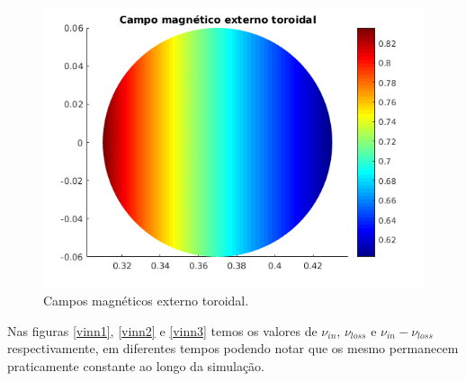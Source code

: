 \documentclass[12pt,oneside,a4paper]{abntex2}
\begin{document}
\begin{figure}[H]
\begin{center}
\includegraphics[scale=0.5]{../SImulacao_breakdown/PDE/CampoMagext.png} 
 \caption{Campos magnéticos externo toroidal.}
\end{center}
\end{figure}
Nas figuras \ref{vinn1}, \ref{vinn2} e \ref{vinn3} temos os valores de $\nu_{in}$, $ \nu_{loss}$ e $\nu_{in} - \nu_{loss}$ respectivamente, em diferentes tempos podendo notar que os mesmo permanecem praticamente constante ao longo da simulação.
\end{document}
